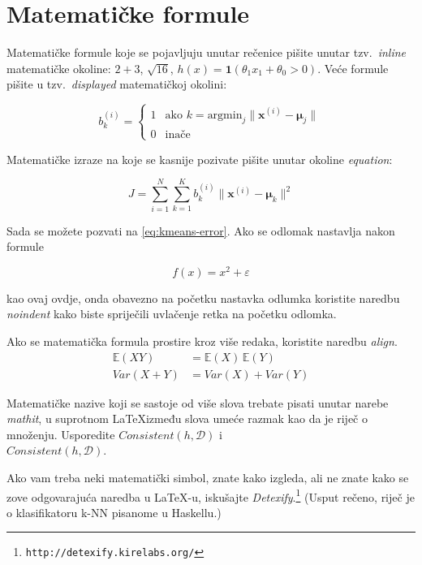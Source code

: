 \documentclass[10pt, a4paper]{article}
\begin{document}
\section{Matematičke formule}

Matematičke formule koje se pojavljuju unutar rečenice pišite unutar
tzv.~\emph{inline} matematičke okoline: $2+3$, $\sqrt{16}$,
$h(x)=\mathbf{1}(\theta_1 x_1 + \theta_0>0)$. Veće formule pišite u
tzv.~\emph{displayed} matematičkoj okolini:

\[
b^{(i)}_k = \begin{cases}
1 & \text{ako 
    $k = \text{argmin}_j \| \mathbf{x}^{(i)} - \mathbf{\mu}_j \|$}\\
0 & \text{inače}
\end{cases}
\]

Matematičke izraze na koje se kasnije pozivate pišite unutar
okoline \emph{equation}:

\begin{equation}\label{eq:kmeans-error}
J = \sum_{i=1}^N \sum_{k=1}^K 
b^{(i)}_k \| \mathbf{x}^{(i)} - \mathbf{\mu}_k \|^2
\end{equation}

Sada se možete pozvati na \eqref{eq:kmeans-error}. Ako se
odlomak nastavlja nakon formule

\begin{equation}
f(x) = x^2 + \varepsilon
\end{equation}

\noindent kao ovaj ovdje, onda obavezno na početku nastavka odlumka
koristite naredbu \emph{noindent} kako biste spriječili uvlačenje
retka na početku odlomka.

Ako se matematička formula prostire kroz više redaka, koristite
naredbu \emph{align}.
\begin{align}
\mathbb{E}(X Y) &= \mathbb{E}(X)\, \mathbb{E}(Y)\nonumber\\
\mathit{Var}(X+Y) &= \mathit{Var}(X) + \mathit{Var}(Y)\nonumber
\end{align}

Matematičke nazive koji se sastoje od više slova trebate pisati unutar
narebe \emph{mathit}, u suprotnom \LaTeX između slova umeće razmak kao
da je riječ o množenju. Usporedite
$\mathit{Consistent}(h,\mathcal{D})$ i\\
$Consistent(h,\mathcal{D})$.

Ako vam treba neki matematički simbol, znate kako izgleda, ali ne znate
kako se zove odgovarajuća naredba u \LaTeX-u, iskušajte
\emph{Detexify}.\footnote{\texttt{http://detexify.kirelabs.org/}}
(Usput rečeno, riječ je o klasifikatoru k-NN pisanome u Haskellu.)
\end{document}
